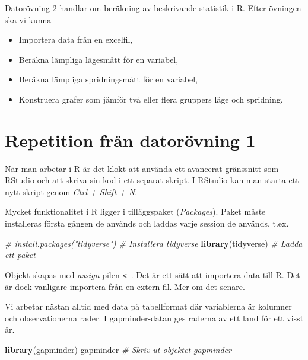 \documentclass[
]{book}
\newenvironment{Shaded}{\begin{snugshade}}{\end{snugshade}}
\newcommand{\CommentTok}[1]{\textcolor[rgb]{0.56,0.35,0.01}{\textit{#1}}}
\newcommand{\FunctionTok}[1]{\textcolor[rgb]{0.13,0.29,0.53}{\textbf{#1}}}
\newcommand{\NormalTok}[1]{#1}
\providecommand{\tightlist}{%
  \setlength{\itemsep}{0pt}\setlength{\parskip}{0pt}}
\theoremstyle{definition}
\theoremstyle{definition}
\theoremstyle{definition}
\theoremstyle{definition}
\theoremstyle{remark}
\begin{document}
Datorövning 2 handlar om beräkning av beskrivande statistik i R. Efter övningen ska vi kunna

\begin{itemize}
\tightlist
\item
  Importera data från en excelfil,
\item
  Beräkna lämpliga lägesmått för en variabel,
\item
  Beräkna lämpliga spridningsmått för en variabel,
\item
  Konstruera grafer som jämför två eller flera gruppers läge och spridning.
\end{itemize}

\section{Repetition från datorövning 1}\label{repetition-fruxe5n-datoruxf6vning-1}

När man arbetar i R är det klokt att använda ett avancerat gränssnitt som RStudio och att skriva sin kod i ett separat skript. I RStudio kan man starta ett nytt skript genom \emph{Ctrl + Shift + N}.

Mycket funktionalitet i R ligger i tilläggspaket (\emph{Packages}). Paket måste installeras första gången de används och laddas varje session de används, t.ex.

\begin{Shaded}
\begin{Highlighting}[]
\CommentTok{\# install.packages("tidyverse") \# Installera tidyverse}
\FunctionTok{library}\NormalTok{(tidyverse)              }\CommentTok{\# Ladda ett paket}
\end{Highlighting}
\end{Shaded}

Objekt skapas med \emph{assign}-pilen \texttt{\textless{}-}. Det är ett sätt att importera data till R. Det är dock vanligare importera från en extern fil. Mer om det senare.

Vi arbetar nästan alltid med data på tabellformat där variablerna är kolumner och observationerna rader. I gapminder-datan ges raderna av ett land för ett visst år.

\begin{Shaded}
\begin{Highlighting}[]
\FunctionTok{library}\NormalTok{(gapminder)}
\NormalTok{gapminder                       }\CommentTok{\# Skriv ut objektet gapminder}
\end{Highlighting}
\end{Shaded}
\end{document}
